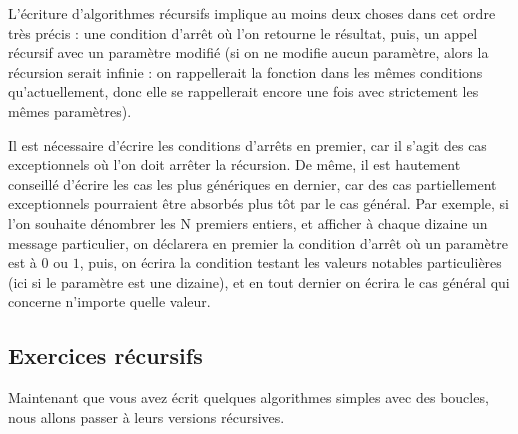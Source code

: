 \documentclass[11pt,a4paper]{article}
\begin{document}
\smallskip

L'écriture d'algorithmes récursifs implique au moins deux choses dans cet ordre très précis : une condition d'arrêt où l'on retourne le résultat, puis, un appel récursif avec un paramètre modifié (si on ne modifie aucun paramètre, alors la récursion serait infinie : on rappellerait la fonction dans les mêmes conditions qu'actuellement, donc elle se rappellerait encore une fois avec strictement les mêmes paramètres).

\smallskip

Il est nécessaire d'écrire les conditions d'arrêts en premier, car il s'agit des cas exceptionnels où l'on doit arrêter la récursion.
De même, il est hautement conseillé d'écrire les cas les plus génériques en dernier, car des cas partiellement exceptionnels pourraient être absorbés plus tôt par le cas général.
Par exemple, si l'on souhaite dénombrer les N premiers entiers, et afficher à chaque dizaine un message particulier, on déclarera en premier la condition d'arrêt où un paramètre est à $ 0 $ ou $ 1 $, puis, on écrira la condition testant les valeurs notables particulières (ici si le paramètre est une dizaine), et en tout dernier on écrira le cas général qui concerne n'importe quelle valeur.

\bigskip


\subsection{Exercices récursifs}

Maintenant que vous avez écrit quelques algorithmes simples avec des boucles, nous allons passer à leurs versions récursives.

\bigskip


\bigskip
\end{document}
